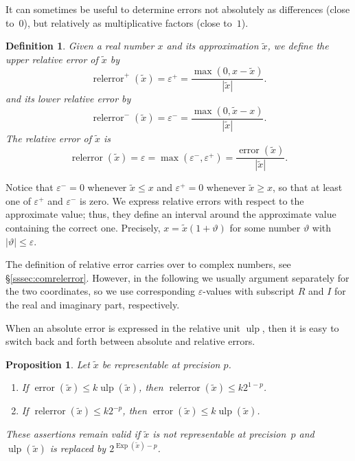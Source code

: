 \documentclass [12pt]{article}
\newcommand {\corr}[1]{{#1}}
\newcommand {\appro}[1]{\widetilde {#1}}
\newcommand {\Ulp}{{\operatorname {ulp}}}
\DeclareMathOperator{\Exp}{\operatorname {Exp}}
\newcommand{\error}{\operatorname {error}}
\newcommand{\relerror}{\operatorname {relerror}}
\renewcommand {\epsilon}{\varepsilon}
\renewcommand {\theta}{\vartheta}
\renewcommand {\leq}{\leqslant}
\renewcommand {\geq}{\geqslant}
\newtheorem{definition}[theorem]{Definition}
\newtheorem{prop}[theorem]{Proposition}
\begin{document}
It can sometimes be useful to determine errors not absolutely as differences
(close to~$0$),
but relatively as multiplicative factors (close to~$1$).

\begin {definition}
\label {def:relerror}
Given a real number $\corr x$ and its approximation $\appro x$,
we define the {\em upper relative error} of $\appro x$ by
\[
\relerror^+ (\appro x) = \epsilon^+
= \frac {\max (0, \corr x - \appro x)}{|\appro x|}.
\]
and its {\em lower relative error} by
\[
\relerror^- (\appro x) = \epsilon^-
= \frac {\max (0, \appro x - \corr x)}{|\appro x|}.
\]
The {\em relative error} of $\appro x$ is
\[
\relerror (\appro x) = \epsilon = \max (\epsilon^-, \epsilon^+)
= \frac {\error (\appro x)}{|\appro x|}.
\]
\end {definition}

Notice that $\epsilon^- = 0$ whenever $\appro x \leq \corr x$ and
$\epsilon^+ = 0$ whenever $\appro x \geq \corr x$, so that at least one of
$\epsilon^+$ and $\epsilon^-$ is zero. We express relative errors with
respect to the approximate value; thus, they define an interval around
the approximate value containing the correct one. Precisely,
$\corr x = \appro x (1 + \vartheta)$ for some number $\theta$ with
$|\theta| \leq \epsilon$.

The definition of relative error carries over to complex numbers,
see \S\ref {sssec:comrelerror}.
However, in the following we usually argument separately for the two coordinates,
so we use corresponding $\epsilon$-values with subscript $R$ and $I$ for the
real and imaginary part, respectively.

When an absolute error is expressed in the relative unit $\Ulp$, then
it is easy to switch back and forth between absolute and relative errors.

\begin {prop}
\label {prop:relerror}
Let $\appro x$ be representable at precision $p$.
\begin {enumerate}
\item
If $\error (\appro x) \leq k \Ulp (\appro x)$,
then $\relerror (\appro x) \leq k 2^{1 - p}$.
\item
If $\relerror (\appro x) \leq k 2^{-p}$,
then $\error (\appro x) \leq k \Ulp (\appro x)$.
\end {enumerate}
These assertions remain valid if $\appro x$ is not representable at
precision~$p$ and $\Ulp (\appro x)$ is replaced by $2^{\Exp (\appro x) - p}$.
\end {prop}
\end{document}
